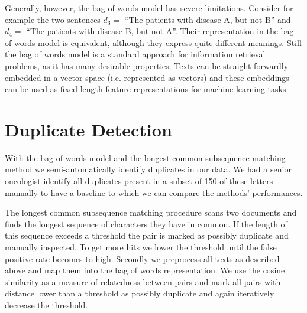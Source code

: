 Generally, however, the bag of words model has severe limitations. Consider for example
the two sentences $d_{3}=$ ``The patients with disease A, but not B'' and $d_{4}=$ ``The patients with disease B, but not A''. Their representation in the bag of words model is equivalent,
although they express quite different meanings. Still the bag of words
model is a standard approach for information retrieval problems, as
it has many desirable properties. Texts can be straight forwardly embedded in a vector space (i.e. represented as vectors) and these embeddings can be used as fixed length feature representations for machine learning tasks.



\section{Duplicate Detection}

With the bag of words model and the longest common subsequence matching method we semi-automatically identify duplicates in our data. We had a senior oncologist identify all duplicates present in a subset of 150 of these letters manually to have a baseline to which we can compare the methods' performances.

The longest common subsequence matching procedure scans two documents and finds the longest sequence of characters they have in common. If the length of this sequence exceeds a threshold the pair is marked as possibly duplicate and manually inspected. To get more hits we lower the threshold until the false positive rate becomes to high. Secondly we preprocess all texts as described above and map them into the bag of words representation. We use the cosine similarity as a measure of relatedness between pairs and mark all pairs with distance lower than a threshold as possibly duplicate and again iteratively decrease the threshold.


